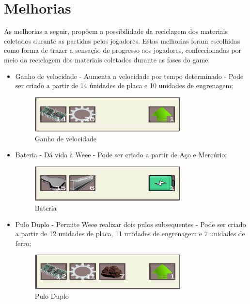 \section{Melhorias}
As melhorias a seguir, propõem a possibilidade da reciclagem dos materiais coletados durante as partidas pelos jogadores. Estas melhorias foram escolhidas como forma de trazer a sensação de progresso aos jogadores, confeccionadas por meio da reciclagem dos materiais coletados durante as fases do game.
\begin{itemize}
    \item Ganho de velocidade - Aumenta a velocidade por tempo determinado - Pode ser criado a partir de 14 únidades de placa e 10 unidades de engrenagem;
    \begin{figure}[hbt!]
        \centering
        \includegraphics[width=300px]{figuras/receita_double_speed.png}
        \caption{Ganho de velocidade}
        \label{fig_receita_double_speed}
    \end{figure}
    
    \item Bateria - Dá vida à Weee - Pode ser criado a partir de Aço e Mercúrio;
    \begin{figure}[hbt!]
        \centering
        \includegraphics[width=300px]{figuras/receita_vida.png}
        \caption{Bateria}
        \label{fig_receita_vida}
    \end{figure}
    
    \item Pulo Duplo - Permite Weee realizar dois pulos subsequentes - Pode ser criado a partir de 12 unidades de placa, 11 unidades de engrenagem e 7 unidades de ferro;
    \begin{figure}[hbt!]
        \centering
        \includegraphics[width=300px]{figuras/receita_double_jump.png}
        \caption{Pulo Duplo}
        \label{fig_receita_double_jump}
    \end{figure}
    

\end{itemize}
